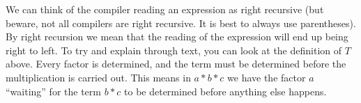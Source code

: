 \documentclass{scrartcl}
\begin{document}
We can think of the compiler reading an expression as right recursive (but beware, not all compilers are right recursive. It is best to always use parentheses). By right recursion we mean that the reading of the expression will end up being right to left. To try and explain through text, you can look at the definition of $T$ above. Every factor is determined, and the term must be determined before the multiplication is carried out. This means in $a*b*c$ we have the factor $a$ ``waiting'' for the term $b*c$ to be determined before anything else happens.
\end{document}
